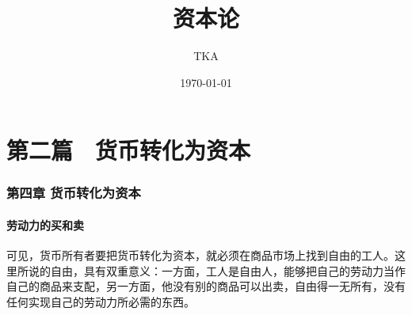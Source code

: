 \documentclass[a4paper]{article}
\title{\heiti\zihao{2} 资本论}
\author{TKA}
\date{\today}
\begin{document}
    \maketitle

    \tableofcontents

    \part{第二篇　货币转化为资本}

    \section{第四章  货币转化为资本}
    \subsection{劳动力的买和卖}

    可见，货币所有者要把货币转化为资本，就必须在商品市场上找到自由的工人。这里所说的自由，具有双重意义：一方面，工人是自由人，能够把自己的劳动力当作自己的商品来支配，另一方面，他没有别的商品可以出卖，自由得一无所有，没有任何实现自己的劳动力所必需的东西。
\end{document}
